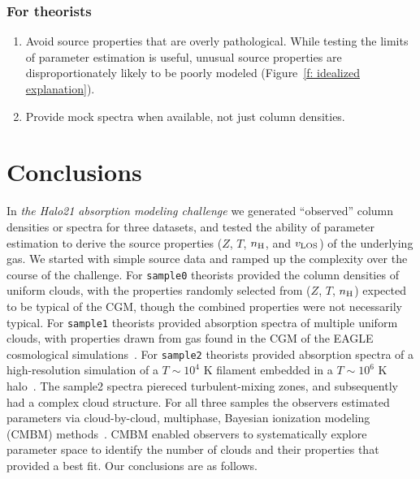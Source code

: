 \documentclass[fleqn,usenatbib]{mnras}
\begin{document}
\subsubsection{For theorists}

\begin{enumerate}
    \item Avoid source properties that are overly pathological. While testing the limits of  parameter estimation is useful, unusual source properties are disproportionately likely to be poorly modeled (Figure~\ref{f: idealized explanation}).
    \item Provide mock spectra when available, not just column densities.
\end{enumerate}

\section{Conclusions}
\label{s: conclusions}

In \textit{the Halo21 absorption modeling challenge} we generated ``observed'' column densities or spectra for three datasets,
and tested the ability of parameter estimation to derive the source properties ($Z$, $T$, $n_{\rm H}$, and $v_{\rm LOS}$) of the underlying gas.
We started with simple source data and ramped up the complexity over the course of the challenge.
For \texttt{sample0} theorists provided the column densities of uniform clouds, with the properties randomly selected from ($Z$, $T$, $n_{\rm H}$) expected to be typical of the CGM, though the combined properties were not necessarily typical.
For \texttt{sample1} theorists provided absorption spectra of multiple uniform clouds, with properties drawn from gas found in the CGM of the EAGLE cosmological simulations~\citep[e.g.][]{schaye2015EAGLE}.
For \texttt{sample2} theorists provided absorption spectra of a high-resolution simulation of a $T \sim 10^4$ K filament embedded in a $T \sim 10^6$ K halo~\citep{mandelker2020Instability}.
The sample2 spectra piereced turbulent-mixing zones, and subsequently had a complex cloud structure.
For all three samples the observers estimated parameters via cloud-by-cloud, multiphase, Bayesian ionization modeling (CMBM) methods~\citep{sameer2021Cloudbycloud, sameer2022Probing}.
CMBM enabled observers to systematically explore parameter space to identify the number of clouds and their properties that provided a best fit.
Our conclusions are as follows.
\end{document}
